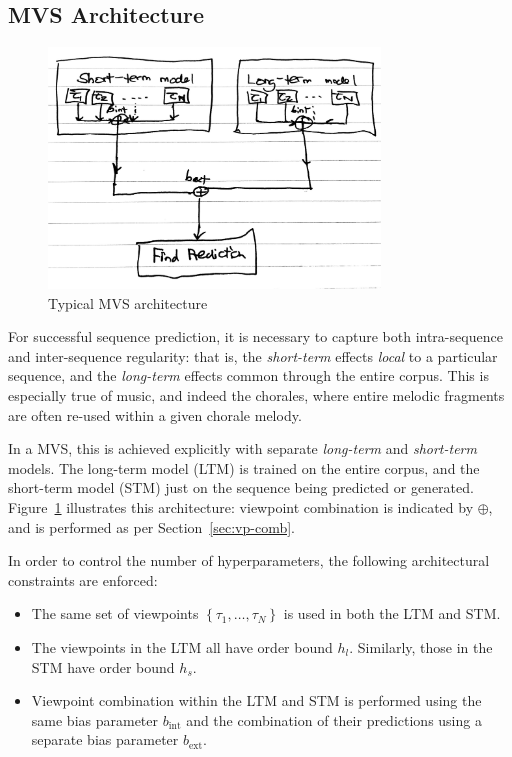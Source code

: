 \documentclass[12pt,a4paper,twoside,openright]{report}
\newcommand{\sref}[1]{Section~\ref{#1}}
\newcommand{\set}[1]{ \left\{ #1 \right\} }
\begin{document}
\subsection{MVS Architecture}\label{sec:mvs-arch}

\begin{figure}[H]
\centering
\includegraphics[width=250pt]{figs/mvs_arch_tmp.jpg}
\caption{Typical MVS architecture}
\label{fig:mvs-arch}
\end{figure}

For successful sequence prediction, it is necessary to capture both
intra-sequence and inter-sequence regularity: that is, the \emph{short-term}
effects \emph{local} to a particular sequence, and the \emph{long-term} effects
common through the entire corpus.  This is especially true of music, and indeed
the chorales, where entire melodic fragments are often re-used within a given
chorale melody.

In a MVS, this is achieved explicitly with separate \emph{long-term} and
\emph{short-term} models. The long-term model (LTM) is trained on the entire
corpus, and the short-term model (STM) just on the sequence being predicted or
generated. Figure~\ref{fig:mvs-arch} illustrates this architecture: viewpoint
combination is indicated by $\oplus$, and is performed as per
\sref{sec:vp-comb}.

In order to control the number of hyperparameters, the following architectural
constraints are enforced:
\begin{itemize}
  \item The same set of viewpoints $\set{\tau_1, \ldots, \tau_N}$ is used in both
    the LTM and STM. 
  \item The viewpoints in the LTM all have order bound $h_l$. Similarly, those
    in the STM have order bound $h_s$.
  \item Viewpoint combination within the LTM and STM is performed using the same
    bias parameter $b_{\mathrm{int}}$ and the combination of their predictions
    using a separate bias parameter $b_{\mathrm{ext}}$.
\end{itemize}
\end{document}
